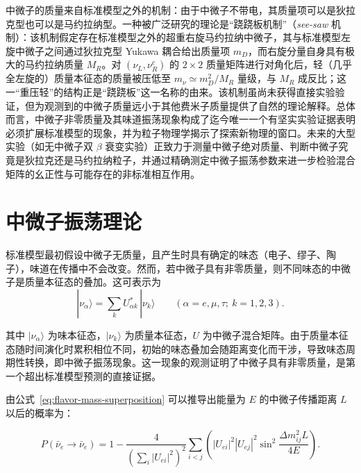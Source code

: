 中微子的质量来自标准模型之外的机制：由于中微子不带电，其质量项可以是狄拉克型也可以是马约拉纳型。一种被广泛研究的理论是“跷跷板机制”（\textit{see-saw} 机制）：该机制假定存在标准模型之外的超重右旋马约拉纳中微子，其与标准模型左旋中微子之间通过狄拉克型 Yukawa 耦合给出质量项 $m_D$，而右旋分量自身具有极大的马约拉纳质量 $M_R$。对 $(\nu_L,\nu_R^c)$ 的 $2\times 2$ 质量矩阵进行对角化后，轻（几乎全左旋的）质量本征态的质量被压低至 $m_\nu\simeq m_D^2/M_R$ 量级，与 $M_R$ 成反比；这一“重压轻”的结构正是“跷跷板”这一名称的由来\cite{Minkowski1977,Yanagida1979,GellMann1979,Mohapatra1980}。该机制虽尚未获得直接实验验证，但为观测到的中微子质量远小于其他费米子质量提供了自然的理论解释。总体而言，中微子非零质量及其味道振荡现象构成了迄今唯一一个有坚实实验证据表明必须扩展标准模型的现象，并为粒子物理学揭示了探索新物理的窗口\cite{JUNO2016YellowBook,Abusleme2022_Physics}。未来的大型实验（如无中微子双 $\beta$ 衰变实验）正致力于测量中微子绝对质量、判断中微子究竟是狄拉克还是马约拉纳粒子，并通过精确测定中微子振荡参数来进一步检验混合矩阵的幺正性与可能存在的非标准相互作用。

\section{中微子振荡理论}

标准模型最初假设中微子无质量，且产生时具有确定的味态（电子、缪子、陶子），味道在传播中不会改变。然而，若中微子具有非零质量，则不同味态的中微子是质量本征态的叠加。这可表示为
\begin{equation}
|\nu_\alpha\rangle=\sum_{k}U^*_{\alpha k}\,|\nu_k\rangle\qquad(\alpha=e,\mu,\tau;\ k=1,2,3).
\label{eq:flavor-mass-superposition}
\end{equation}

其中 $|\nu_\alpha\rangle$ 为味本征态，$|\nu_k\rangle$ 为质量本征态，$U$ 为中微子混合矩阵\cite{Pontecorvo1957,Pontecorvo1958,Maki1962}。由于质量本征态随时间演化时累积相位不同，初始的味态叠加会随距离变化而干涉，导致味态周期性转换，即中微子振荡现象。这一现象的观测证明了中微子具有非零质量，是第一个超出标准模型预测的直接证据。

由公式~\ref{eq:flavor-mass-superposition} 可以推导出能量为 $E$ 的中微子传播距离 $L$ 以后的概率为\cite{Pontecorvo1957,Pontecorvo1958}：

\begin{equation}
    P(\bar{\nu}_e \rightarrow \bar{\nu}_e)
    =
    1-
    \frac{4}{\left(\sum_i |U_{ei}|^2 \right)^2}
    \sum_{i<j}
    \left(
    |U_{ei}|^2 |U_{ej}|^2
    \sin^2 \frac{\Delta m_{ij}^2 L}{4E}
    \right).
\label{eq:formula_prob}
\end{equation} 

